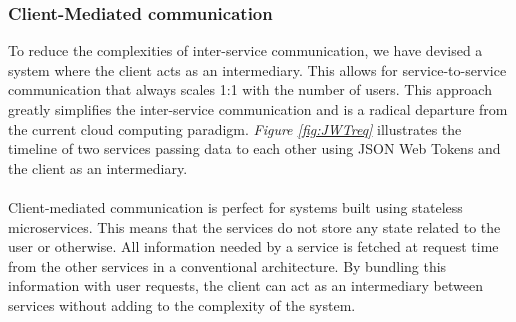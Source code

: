 \documentclass[12pt]{article}
\begin{document}
\subsubsection{Client-Mediated communication}
To reduce the complexities of inter-service communication, we have devised a system where the client acts as an intermediary.
This allows for service-to-service communication that always scales 1:1 with the number of users.  
This approach greatly simplifies the inter-service communication and is a radical departure from the current cloud computing paradigm.
\textit{Figure \ref{fig:JWTreq}} illustrates the timeline of two services passing data to each other using JSON Web Tokens and the client as an intermediary.
\\
\\
Client-mediated communication is perfect for systems built using stateless microservices. 
This means that the services do not store any state related to the user or otherwise.
All information needed by a service is fetched at request time from the other services in a conventional architecture.
By bundling this information with user requests, the client can act as an intermediary between services without 
adding to the complexity of the system.

\newpage
\end{document}
